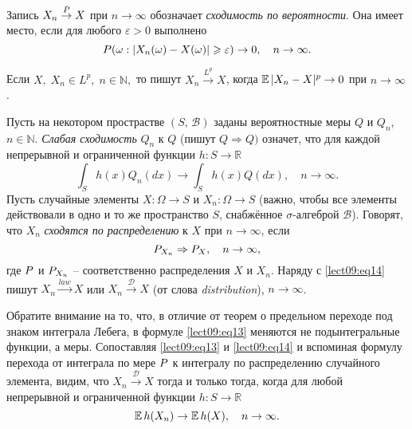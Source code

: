 \begin{definition}\label{lect09:def6}
Запись $X_n\overset{\P}{\to}X$ при $n\to\infty$ обозначает \emph{сходимость по вероятности}. Она имеет место, если для любого $\varepsilon>0$ выполнено
\[ \P(\omega:|X_n(\omega)-X(\omega)|\geqslant\varepsilon)\to 0,\quad n\to\infty. \]
\end{definition}

\begin{definition}\label{lect09:def7}
Если $X,\;X_n\in L^p,\;n\in\mathbb{N},$ то пишут $X_n\overset{L^p}{\to}X$, когда $\E|X_n-X|^p\to 0$ при $n\to\infty$.
\end{definition}

\begin{definition}\label{lect09:def8}
Пусть на некотором прострастве $(S,\,\mathcal{B})$ заданы вероятностные меры $Q$ и $Q_n$, \mbox{$n\in\mathbb{N}$}. \emph{Слабая сходимость} $Q_n$ к $Q$ (пишут $Q\Rightarrow Q)$ означет, что для каждой непрерывной и ограниченной функции $h\colon S\to\mathbb{R}$ 
\begin{equation}\label{lect09:eq13}
\int_Sh(x)Q_n(dx)\to\int_Sh(x)Q(dx),\quad n\to\infty.
\end{equation}
Пусть случайные элементы $X\colon\Omega\to S$ и $X_n\colon\Omega\to S$ (важно, чтобы все элементы действовали в одно и то же пространство $S$, снабжённое $\sigma$-алгеброй $\mathcal{B}$). Говорят, что $X_n$ \emph{сходятся по распределению} к $X$ при $n\to\infty$, если
\begin{equation}\label{lect09:eq14}
\P_{X_n}\Rightarrow \P_X,\quad n\to\infty,
\end{equation}
где $\P$ и $\P_{X_n}$ -- соответственно распределения $X$ и $X_n$. Наряду с \ref{lect09:eq14} пишут $X_n\overset{law}{\to} X$ или $X_n\overset{\mathcal{D}}{\to}X$ (от слова \emph{distribution}), $n\to\infty$.
\end{definition}

Обратите внимание на то, что, в отличие от теорем о предельном переходе под знаком интеграла Лебега, в формуле \ref{lect09:eq13} меняются не подынтегральные функции, а меры. Сопоставляя \ref{lect09:eq13} и \ref{lect09:eq14} и вспоминая формулу перехода от интеграла по мере $\P$ к интегралу по распределению случайного элемента, видим, что $X_n\overset{\mathcal{D}}{\to}X$ тогда и только тогда, когда для любой непрерывной и ограниченной функции $h\colon S\to\mathbb{R}$
\begin{equation}\label{lect09:eq15}
\E h(X_n)\to\E h(X),\quad n\to\infty.
\end{equation} 

